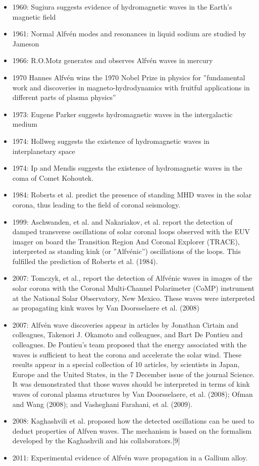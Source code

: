 \documentclass[../main.tex]{subfiles}
\begin{document}
\begin{itemize}
\item 1960: Sugiura suggests evidence of hydromagnetic waves in the Earth's magnetic field
\item 1961: Normal Alfv\'en modes and resonances in liquid sodium are studied by Jameson
\item 1966: R.O.Motz generates and observes Alfv\'en waves in mercury
\item 1970 Hannes Alfv\'en wins the 1970 Nobel Prize in physics for ''fundamental work and discoveries in magneto-hydrodynamics with fruitful applications in different parts of plasma physics''
\item 1973: Eugene Parker suggests hydromagnetic waves in the intergalactic medium
\item 1974: Hollweg suggests the existence of hydromagnetic waves in interplanetary space
\item 1974: Ip and Mendis suggests the existence of hydromagnetic waves in the coma of Comet Kohoutek.
\item 1984: Roberts et al. predict the presence of standing MHD waves in the solar corona, thus leading to the field of coronal seismology.
\item 1999: Aschwanden, et al. and Nakariakov, et al. report the detection of damped transverse oscillations of solar coronal loops observed with the EUV imager on board the Transition Region And Coronal Explorer (TRACE), interpreted as standing kink (or ''Alfv\'enic'') oscillations of the loops. This fulfilled the prediction of Roberts et al. (1984).
\item 2007: Tomczyk, et al., report the detection of Alfv\'enic waves in images of the solar corona with the Coronal Multi-Channel Polarimeter (CoMP) instrument at the National Solar Observatory, New Mexico. These waves were interpreted as propagating kink waves by Van Doorsselaere et al. (2008)
\item 2007: Alfv\'en wave discoveries appear in articles by Jonathan Cirtain and colleagues, Takenori J. Okamoto and colleagues, and Bart De Pontieu and colleagues. De Pontieu's team proposed that the energy associated with the waves is sufficient to heat the corona and accelerate the solar wind. These results appear in a special collection of 10 articles, by scientists in Japan, Europe and the United States, in the 7 December issue of the journal Science. It was demonstrated that those waves should be interpreted in terms of kink waves of coronal plasma structures by Van Doorsselaere, et al. (2008); Ofman and Wang (2008); and Vasheghani Farahani, et al. (2009).
\item 2008: Kaghashvili et al. proposed how the detected oscillations can be used to deduct properties of Alfven waves. The mechanism is based on the formalism developed by the Kaghashvili and his collaborators.[9]
\item 2011: Experimental evidence of Alfvén wave propagation in a Gallium alloy.
\end{itemize}
\end{document}
